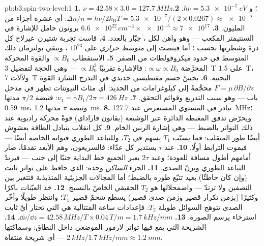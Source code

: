 \begin{solution}{pb:b3:spin-two-level:1}
\textbf{1.} $\nu = 42.58 \times 3.0 = \qty{127.7}{MHz}$؛ و $h\nu =
\qty{5.3e-7}{eV}$.
\textbf{2.} $\Delta n/n = h\nu/2k_{\text{B}}T = \num{5.3e-7}/(2
\times 0.0267) \approx \num{e-5}$: أي عشرة أجزاء من المليون.
\textbf{3.} $\num{6.6e22}\,\unit{cm^{-3}} \times \num{e-5} \approx
\num{7e17}$ بروتون حامل للإشارة في السنتيمتر المكعب --- وهو واهن
لكل ، جبّار بالعدد.
\textbf{4.} قاست تجربة شتيرن--غيرلاخ كل ذرة وشطرتها بحسب
؛ أما  فينصت إلى \emph{متوسط حراري} على $10^{23}$
، ويبقي بولتزمان ذلك المتوسط في حدود ميكروفولطات من الصفر.
\textbf{5.} الاستقطاب $\propto B_0$ والقوة المحركة المحرَّضة
$\propto \omega \propto B_0$: فالإشارة تقريبًا $\propto B_0^2$ ---
وهي الحجة لتفضيل \qty{3}{T} على \qty{1.5}{T}، ولآلات
\qty{7}{T} البحثية.
\textbf{6.} يحسّ جسم مغنطيسي حديدي في التدرج الشارد
القوة $F = \mu\,\partial B/\partial z$ محجَّمةً إلى كيلوغرامات من الحديد:
أي مئات النيوتنات تظهر في مدخل باب --- وهو سبب
التدريع وقوائم التحقق.
\textbf{7.} $\nu_1 = \gamma B_1/2\pi = \qty{426}{Hz}$: فنبضة $\pi/2$
مدتها \qty{0.59}{ms}، ونبضة $\pi$ مدتها \qty{1.2}{ms}.
\textbf{8.} تبادر في المستوي المستعرض عند
\qty{127.7}{MHz}؛ ويحرّض تدفق المغنطة الدائرة عبر
الوشيعة (بقانون فاراداي) قوةً محركة راديوية عند ذلك التواتر بالضبط ---
وهي إشارة الرنين الخام.
\textbf{9.} كل انقلاب يتبادل الطاقة يعشوِش أيضًا طور
 المنقلب: فما يسبّب $T_1$ يسهم في $T_2$،
وللتباعد الطوري قنواته الخاصة أيضًا --- فيموت الترابط
أولًا.
\textbf{10.} عند $\tau$ يستدير كل عدّاء: فالسريعون، وهم
الأبعد تقدمًا، صار أمامهم أطول مسافة للعودة؛ وعند $2\tau$ يعبر
الجميع خط البداية جنبًا إلى جنب --- فيرتدّ التباعد الطوري ويرنّ
الصدى.
\textbf{11.} الجزء \emph{الساكن} وحده:  الذي حافظ على
تواتر ثابت (وإن كان خاطئًا) يعيد تتبّع طوره بالضبط؛
أما المجالات الجزيئية المتذبذبة فتتغير بين النصفين ولا
ترتدّ --- واضمحلالها هو $T_2$ الحقيقي الخاصّ بالنسيج.
\textbf{12.} خذ العيّنات باكرًا وكثيرًا (بزمن تكرار قصير وزمن صدى قصير)
يسطع شحمٌ قصير $T_1$؛ وانتظر طويلًا وأخّر الصدى تتوهج السوائل
طويلة $T_2$: فإعدادات ساعة المتتالية هي التي تختار أيّ ثابت
استرخاء يرسم الصورة.
\textbf{13.} $\dd\nu/\dd z = 42.58\,\unit{MHz/T} \times
0.04\,\unit{T/m} = \qty{1.7}{kHz/mm}$.
\textbf{14.} الشريحة التي يقع فيها تواتر لارمور الموضعي داخل
النطاق: وسماكتها $\qty{2}{kHz}/\qty{1.7}{kHz/mm} \approx
\qty{1.2}{mm}$ --- أي شريحة منتقاة.

\end{solution}
